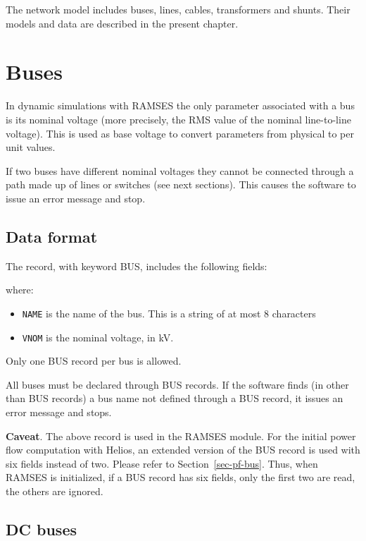 The network model includes buses, lines, cables, transformers and shunts. Their models and data are described in the present chapter.

\section{Buses}\label{sec-netw-buses}

In dynamic simulations with RAMSES the only parameter associated with a bus is its nominal voltage (more precisely, the RMS value of the nominal line-to-line voltage). This is used as base voltage to convert parameters from physical to per unit values.

If two buses have different nominal voltages they cannot be connected through a path made up of lines or switches (see next sections). This causes the software to issue an error message and stop.


\subsection{Data format}

The record, with keyword BUS, includes the following fields:

\hspace*{5ex}{\tt BUS NAME VNOM ;}

where:
\begin{itemize}
\item {\tt NAME} is the name of the bus. This is a string of at most 8 characters
\item {\tt VNOM} is the nominal voltage, in kV.
\end{itemize}

Only one BUS record per bus is allowed.

All buses must be declared through BUS records. If the software finds (in other than BUS records) a bus name not defined through a BUS record, it issues an error message and stops.

{\bf \large Caveat}. The above record is used in the RAMSES module. For the initial power flow computation with Helios, an extended version of the BUS record is used with six fields instead of two. Please refer to Section~\ref{sec-pf-bus}. Thus, when RAMSES is initialized, if a BUS record has six fields, only the first two are read, the others are ignored.

\subsection{DC buses}\label{sec-netw-busdc}

